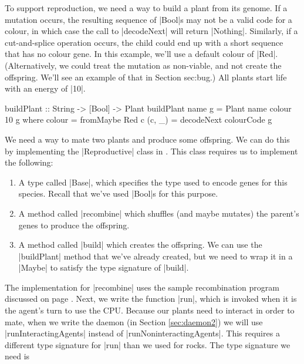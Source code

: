 To support reproduction, we need a way to build a plant from its genome.
If a mutation occurs, the resulting sequence of |Bool|s may not
be a valid code for a colour, in which case the call to |decodeNext|
will return |Nothing|.
Similarly, if a cut-and-splice operation occurs,
the child could end up with a short sequence that has no colour gene.
In this example, we'll use a default colour of |Red|.
(Alternatively, we could treat the mutation as non-viable,
and not create the offspring.
We'll see an example of that in Section {sec:bug}.)
All plants start life with an energy of |10|.
        
\begin{code}
buildPlant :: String -> [Bool] -> Plant
buildPlant name g = Plant name colour 10 g
  where colour = fromMaybe Red c
        (c, _) = decodeNext colourCode g
\end{code} 

We need a way to mate two plants and produce some offspring.
We can do this by implementing the |Reproductive| class in 
.
This class requires us to implement the following:
\begin{enumerate}
\item A type called |Base|, which specifies the type used to encode
genes for this species. Recall that we've used |Bool|s for this purpose.
\item A method called |recombine| which shuffles (and maybe mutates) the
 parent's genes to produce the offspring.
\item A method called |build| which creates the offspring.
We can use the |buildPlant| method that we've already created,
but we need to wrap it in a |Maybe| to satisfy the type signature of
|build|.
\end {enumerate}


The implementation for |recombine| uses the sample recombination
program discussed on page \pageref{code:recombination}.
Next, we write the function |run|, 
which is invoked when it is the agent's turn to use the CPU.
Because our plants need to interact in order to mate,
when we write the daemon (in Section \ref{sec:daemon2}) we will use
|runInteractingAgents| instead of |runNoninteractingAgents|.
This requires a different type signature for |run| than we used for
rocks.
The type signature we need is


